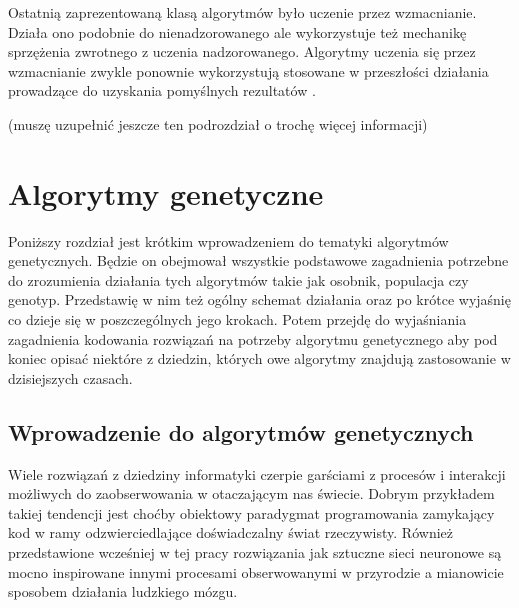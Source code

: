 \documentclass[12pt, oneside, a4paper]{report}
\begin{document}
Ostatnią zaprezentowaną klasą algorytmów było uczenie przez wzmacnianie. Działa ono podobnie do nienadzorowanego ale wykorzystuje też mechanikę sprzężenia zwrotnego z uczenia nadzorowanego. Algorytmy uczenia się przez wzmacnianie zwykle ponownie wykorzystują stosowane w przeszłości działania prowadzące do uzyskania pomyślnych rezultatów \citep{roelants2017deeplearning}.

(muszę uzupełnić jeszcze ten podrozdział o trochę więcej informacji)


\chapter{Algorytmy genetyczne}

Poniższy rozdział jest krótkim wprowadzeniem do tematyki algorytmów genetycznych. Będzie on obejmował wszystkie podstawowe zagadnienia potrzebne do zrozumienia działania tych algorytmów takie jak osobnik, populacja czy genotyp. Przedstawię w nim też ogólny schemat działania oraz po krótce wyjaśnię co dzieje się w poszczególnych jego krokach. Potem przejdę do wyjaśniania zagadnienia kodowania rozwiązań na potrzeby algorytmu genetycznego aby pod koniec opisać niektóre z dziedzin, których owe algorytmy znajdują zastosowanie w dzisiejszych czasach.

\section{Wprowadzenie do algorytmów genetycznych}

Wiele rozwiązań z dziedziny informatyki czerpie garściami z procesów i interakcji możliwych do zaobserwowania w otaczającym nas świecie. Dobrym przykładem takiej tendencji jest choćby obiektowy paradygmat programowania zamykający kod w ramy odzwierciedlające doświadczalny świat rzeczywisty. Również przedstawione wcześniej w tej pracy rozwiązania jak sztuczne sieci neuronowe są mocno inspirowane innymi procesami obserwowanymi w przyrodzie a mianowicie sposobem działania ludzkiego mózgu. 
\end{document}
